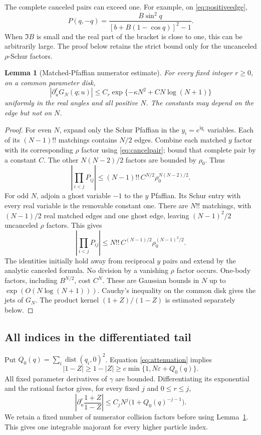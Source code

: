 \documentclass[11pt]{article}
\numberwithin{equation}{section}
\newtheorem{lemma}[theorem]{Lemma}
\theoremstyle{definition}
\newcommand{\ii}{\mathrm i}
\newcommand{\eps}{\varepsilon}
\newcommand{\dist}{\operatorname{dist}}
\begin{document}
The complete canceled pairs can exceed one. For example, on
\eqref{eq:positiveedge},
\[
 P(q,-q)=\frac{B\sin^2q}
               {[b+B(1-\cos q)]^2-1}.
\]
When $\Im B$ is small and the real part of the bracket is close to one,
this can be arbitrarily large. The proof below retains the strict bound
only for the uncanceled $\rho$-Schur factors.

\begin{lemma}[Matched-Pfaffian numerator estimate]\label{lem:matching}
For every fixed integer $r\ge0$, on a common parameter disk,
\[
 |\partial_u^rG_N(q;u)|
 \le C_r\exp\{-\kappa N^2+C N\log(N+1)\}
\]
uniformly in the real angles and all positive $N$. The constants may
depend on the edge but not on $N$.
\end{lemma}
\begin{proof}
For even $N$, expand only the Schur Pfaffian in the $y_i=e^{\ii q_i}$
variables. Each of its $(N-1)!!$ matchings contains $N/2$ edges. Combine
each matched $y$ factor with its corresponding $\rho$ factor using
\eqref{eq:cancelpair}; bound that complete pair by a constant $C$.
The other $N(N-2)/2$ factors are bounded by $\rho_0$. Thus
\[
 \left|\prod_{i<j}P_{ij}\right|
 \le (N-1)!!\,C^{N/2}\rho_0^{N(N-2)/2}.
\]
For odd $N$, adjoin a ghost variable $-1$ to the $y$ Pfaffian.
Its Schur entry with every real variable is the removable constant one.
There are $N!!$ matchings, with $(N-1)/2$ real matched edges and one
ghost edge, leaving $(N-1)^2/2$ uncanceled $\rho$ factors. This gives
\[
 \left|\prod_{i<j}P_{ij}\right|
 \le N!!\,C^{(N-1)/2}\rho_0^{(N-1)^2/2}.
\]
The identities initially hold away from reciprocal $y$ pairs and extend
by the analytic canceled formula. No division by a vanishing $\rho$
factor occurs. One-body factors, including $B^{N/2}$, cost $C^N$.
These are Gaussian bounds in $N$ up to $\exp(O(N\log(N+1)))$.
Cauchy's inequality on the common disk gives the jets of $G_N$.
The product kernel $(1+Z)/(1-Z)$ is estimated separately below.
\end{proof}

\subsection{All indices in the differentiated tail}
Put $Q_0(q)=\sum_i\dist(q_i,0)^2$. Equation
\eqref{eq:attenuation} implies
\[
 |1-Z|\ge1-|Z|\ge c\min\{1,N\eps+Q_0(q)\}.
\]
All fixed parameter derivatives of $\gamma$ are bounded. Differentiating
its exponential and the rational factor gives, for every fixed $j$ and
$0\le r\le j$,
\begin{equation}\label{eq:globaljet}
 \left|\partial_u^r\frac{1+Z}{1-Z}\right|
 \le C_jN^j\bigl(1+Q_0(q)^{-j-1}\bigr).
\end{equation}
We retain a fixed number of numerator collision factors before using
Lemma~\ref{lem:matching}. This gives one integrable majorant for every
higher particle index.
\end{document}
